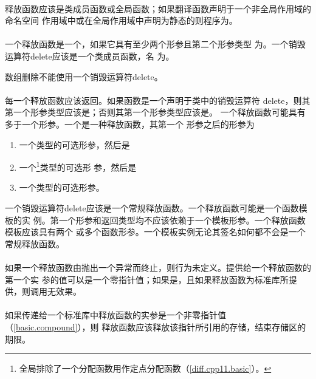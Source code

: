 \paragraph{} %
释放函数应该是类成员函数或全局函数；如果翻译函数声明于一个非全局作用域的命名空间
作用域中或在全局作用域中声明为静态的则程序为\illform{}。

\paragraph{} %
\begin{sloppypar}
一个释放函数是一个，如果它具有至少两个形参且第二个形参类型
为。一个销毁运算符delete应该是一个类成员函数，名
为。
\end{sloppypar}

\begin{note}
  数组删除不能使用一个销毁运算符delete。
\end{note}

\paragraph{} %
每一个释放函数应该返回。如果函数是一个声明于类中的销毁运算符
delete，则其第一个形参类型应该是；否则其第一个形参类型应该是。
一个释放函数可能具有多于一个形参。一个是一种释放函数，其第一个
形参之后的形参为
\begin{enumerate}
  \item 一个类型的可选形参，然后是
  \item 一个\footnote{全局排除了一个分配函数用作定点分配函数（\ref{diff.cpp11.basic}）。}类型的可选形
        参，然后是
  \item 一个类型的可选形参。
\end{enumerate}
一个销毁运算符delete应该是一个常规释放函数。一个释放函数可能是一个函数模板的实
例。第一个形参和返回类型均不应该依赖于一个模板形参。一个释放函数模板应该具有两个
或多个函数形参。一个模板实例无论其签名如何都不会是一个常规释放函数。

\paragraph{} %
如果一个释放函数由抛出一个异常而终止，则行为未定义。提供给一个释放函数的第一个实
参的值可以是一个零指针值；如果是，且如果释放函数为标准库所提供，则调用无效果。

\paragraph{} %
如果传递给一个标准库中释放函数的实参是一个非零指针值（\ref{basic.compound}），则
释放函数应该释放该指针所引用的存储，结束存储区的期限。
